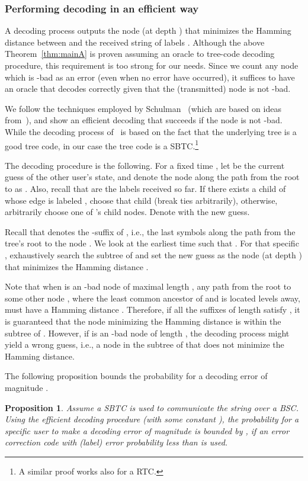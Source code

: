 \documentclass[ letterpaper, 11pt]{article}
\newtheorem{proposition}[theorem]{Proposition}
\newcommand{\RTBC}{\textsf{RTC}\xspace}
\newcommand{\KTC}{\textsf{SBTC}\xspace}
\begin{document}
\subsubsection{Performing decoding in an efficient way}\label{sec:eff}


A decoding process outputs the node  (at depth ) that minimizes the Hamming distance
between  and the received string of labels .
Although the above Theorem~\ref{thm:mainA} is proven assuming an oracle to
tree-code decoding procedure, this requirement is too strong for our needs.
Since we count any node which is -bad as an error (even when no error have occurred),
it suffices to have an oracle that decodes correctly given that the (transmitted) node
is not -bad.

We follow the techniques
employed by Schulman~\cite{schulman96}
(which are based on ideas from~\cite{wozencraft57, reiffen60, fano63}),
and show an efficient decoding that succeeds if the node is
not -bad.
While the decoding process of~\cite{schulman96} is based on the fact that
the underlying tree is a good tree code,
in our case the tree code is a \KTC.\footnote{A similar proof works also for a \RTBC.}


The decoding procedure is the following.
For a fixed time , let  be the current guess of the other user's state,
and denote the node along the path from the root to  as .
Also, recall that   are the labels received so far. If there exists a child of 
whose edge is labeled , choose that child (break ties arbitrarily),
otherwise, arbitrarily choose one of 's child nodes.
Denote with  the new guess.

Recall that  denotes the -suffix of , i.e., the last  symbols along the path from the tree's root to the node .
We look at the earliest time  such that .
For that specific , exhaustively search the subtree of  and set
the new guess  as the node 
(at depth ) that minimizes the Hamming distance .


Note that when  is an -bad node of maximal length ,
any path from the root to some other node ,
where the least common ancestor of  and  is located  levels away,
must have
a Hamming distance .
Therefore, if all the suffixes of length  satisfy
,
it is guaranteed that the
node minimizing the Hamming distance is within the subtree of .
However, if  is an -bad node of length ,
the decoding process might yield a wrong guess,
i.e., a node in the subtree of  that does not minimize the Hamming distance.

The following proposition bounds the probability for a decoding error of magnitude .
\begin{proposition}\label{pro:errorProb}
Assume a \KTC is used to communicate the string  over a BSC.
Using the efficient decoding procedure (with some constant ),
the probability for a specific user to make
a decoding error of magnitude 
is  bounded by ,
if an error correction code with (label)
error probability less than  is used.
\end{proposition}
\end{document}
